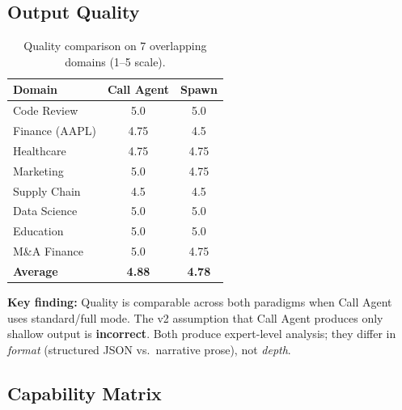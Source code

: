 \documentclass[11pt,twocolumn]{article}
\newcommand{\win}[1]{\cellcolor{winner}#1}
\newcommand{\lose}[1]{\cellcolor{loser}#1}
\newcommand{\tie}[1]{\cellcolor{tied}#1}
\begin{document}
\subsection{Output Quality}

\begin{table}[H]
\centering
\caption{Quality comparison on 7 overlapping domains (1--5 scale).}
\label{tab:quality-overlap}
\begin{tabular}{@{}lcc@{}}
\toprule
\textbf{Domain} & \textbf{Call Agent} & \textbf{Spawn} \\
\midrule
Code Review & \tie{5.0} & \tie{5.0} \\
Finance (AAPL) & \win{4.75} & \lose{4.5} \\
Healthcare & \tie{4.75} & \tie{4.75} \\
Marketing & \win{5.0} & \lose{4.75} \\
Supply Chain & \lose{4.5} & \win{4.5} \\
Data Science & \tie{5.0} & \tie{5.0} \\
Education & \tie{5.0} & \tie{5.0} \\
M\&A Finance & \win{5.0} & \lose{4.75} \\
\midrule
\textbf{Average} & \win{\textbf{4.88}} & \lose{\textbf{4.78}} \\
\bottomrule
\end{tabular}
\end{table}

\textbf{Key finding:} Quality is comparable across both paradigms when Call Agent uses standard/full mode. The v2 assumption that Call Agent produces only shallow output is \textbf{incorrect}. Both produce expert-level analysis; they differ in \emph{format} (structured JSON vs.\ narrative prose), not \emph{depth}.

\subsection{Capability Matrix}
\end{document}
